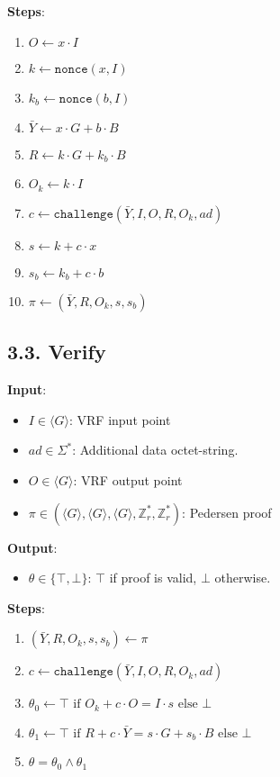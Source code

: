 \documentclass[
]{article}
\providecommand{\tightlist}{%
  \setlength{\itemsep}{0pt}\setlength{\parskip}{0pt}}
\begin{document}
\textbf{Steps}:

\begin{enumerate}
\def\labelenumi{\arabic{enumi}.}
\tightlist
\item
  \(O \gets x \cdot I\)
\item
  \(k \gets \texttt{nonce}(x, I)\)
\item
  \(k_b \gets \texttt{nonce}(b, I)\)
\item
  \(\bar{Y} \gets x \cdot G + b \cdot B\)
\item
  \(R \gets k \cdot G + k_b \cdot B\)
\item
  \(O_k \gets k \cdot I\)
\item
  \(c \gets \texttt{challenge}(\bar{Y}, I, O, R, O_k, ad)\)
\item
  \(s \gets k + c \cdot x\)
\item
  \(s_b \gets k_b + c \cdot b\)
\item
  \(\pi \gets (\bar{Y}, R, O_k, s, s_b)\)
\end{enumerate}

\hypertarget{verify-1}{%
\subsection{3.3. Verify}\label{verify-1}}

\textbf{Input}:

\begin{itemize}
\tightlist
\item
  \(I \in \langle G \rangle\): VRF input point
\item
  \(ad \in \Sigma^*\): Additional data octet-string.
\item
  \(O \in \langle G \rangle\): VRF output point
\item
  \(\pi \in (\langle G \rangle, \langle G \rangle, \langle G \rangle, \mathbb{Z}^*_r, \mathbb{Z}^*_r)\):
  Pedersen proof
\end{itemize}

\textbf{Output}:

\begin{itemize}
\tightlist
\item
  \(\theta \in \{ \top, \bot \}\): \(\top\) if proof is valid, \(\bot\)
  otherwise.
\end{itemize}

\textbf{Steps}:

\begin{enumerate}
\def\labelenumi{\arabic{enumi}.}
\tightlist
\item
  \((\bar{Y}, R, O_k, s, s_b) \gets \pi\)
\item
  \(c \gets \texttt{challenge}(\bar{Y}, I, O, R, O_k, ad)\)
\item
  \(\theta_0 \gets \top \text{ if } O_k + c \cdot O = I \cdot s \text{ else } \bot\)
\item
  \(\theta_1 \gets \top \text{ if } R + c \cdot \bar{Y} = s \cdot G + s_b \cdot B \text{ else } \bot\)
\item
  \(\theta = \theta_0 \land \theta_1\)
\end{enumerate}
\end{document}
